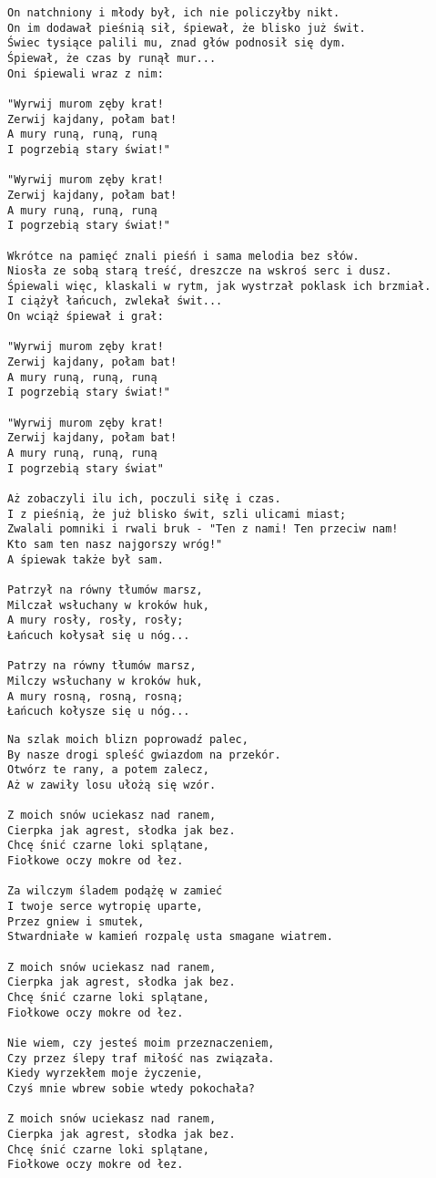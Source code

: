 \documentclass[12pt]{article}
\begin{document}
\begin{verbatim}
On natchniony i młody był, ich nie policzyłby nikt.
On im dodawał pieśnią sił, śpiewał, że blisko już świt.
Świec tysiące palili mu, znad głów podnosił się dym.
Śpiewał, że czas by runął mur...
Oni śpiewali wraz z nim:

"Wyrwij murom zęby krat!
Zerwij kajdany, połam bat!
A mury runą, runą, runą
I pogrzebią stary świat!"

"Wyrwij murom zęby krat!
Zerwij kajdany, połam bat!
A mury runą, runą, runą
I pogrzebią stary świat!"

Wkrótce na pamięć znali pieśń i sama melodia bez słów.
Niosła ze sobą starą treść, dreszcze na wskroś serc i dusz.
Śpiewali więc, klaskali w rytm, jak wystrzał poklask ich brzmiał.
I ciążył łańcuch, zwlekał świt...
On wciąż śpiewał i grał:

"Wyrwij murom zęby krat!
Zerwij kajdany, połam bat!
A mury runą, runą, runą
I pogrzebią stary świat!"

"Wyrwij murom zęby krat!
Zerwij kajdany, połam bat!
A mury runą, runą, runą
I pogrzebią stary świat"

Aż zobaczyli ilu ich, poczuli siłę i czas.
I z pieśnią, że już blisko świt, szli ulicami miast;
Zwalali pomniki i rwali bruk - "Ten z nami! Ten przeciw nam!
Kto sam ten nasz najgorszy wróg!"
A śpiewak także był sam.

Patrzył na równy tłumów marsz,
Milczał wsłuchany w kroków huk,
A mury rosły, rosły, rosły;
Łańcuch kołysał się u nóg...

Patrzy na równy tłumów marsz,
Milczy wsłuchany w kroków huk,
A mury rosną, rosną, rosną;
Łańcuch kołysze się u nóg...
\end{verbatim}
\clearpage

\begin{verbatim}
Na szlak moich blizn poprowadź palec,
By nasze drogi spleść gwiazdom na przekór.
Otwórz te rany, a potem zalecz,
Aż w zawiły losu ułożą się wzór.

Z moich snów uciekasz nad ranem,
Cierpka jak agrest, słodka jak bez.
Chcę śnić czarne loki splątane,
Fiołkowe oczy mokre od łez.

Za wilczym śladem podążę w zamieć
I twoje serce wytropię uparte,
Przez gniew i smutek,
Stwardniałe w kamień rozpalę usta smagane wiatrem.

Z moich snów uciekasz nad ranem,
Cierpka jak agrest, słodka jak bez.
Chcę śnić czarne loki splątane,
Fiołkowe oczy mokre od łez.

Nie wiem, czy jesteś moim przeznaczeniem,
Czy przez ślepy traf miłość nas związała.
Kiedy wyrzekłem moje życzenie,
Czyś mnie wbrew sobie wtedy pokochała?

Z moich snów uciekasz nad ranem,
Cierpka jak agrest, słodka jak bez.
Chcę śnić czarne loki splątane,
Fiołkowe oczy mokre od łez.
\end{verbatim}
\clearpage
\end{document}
